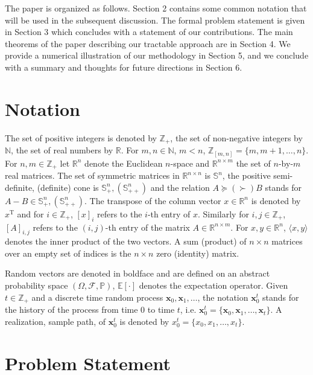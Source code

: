 \documentclass[letterpaper,11pt]{article}
\newcommand{\T}{\mathrm{T}}
\begin{document}
The paper is organized as follows.  Section 2 contains some common notation that will be used in the subsequent discussion. 
The formal problem statement is given in
Section 3 which concludes with a statement of our contributions. The main theorems of the paper describing our tractable approach are in Section 4. We provide a numerical 
illustration of our methodology in Section 5, and we conclude with a summary and thoughts for future directions in Section 6.


\section{Notation}
The set of positive integers is denoted by $ \mathbb{Z}_{+} $, the set of non-negative integers by
$\mathbb{N} $,
the set of real numbers by $ \mathbb{R}$. For $m,n \in \mathbb{N}$, $m< n $,
$ \mathbb{Z}_{[m,n]} = \{m,m+1, \hdots, n \}$.
For $n,m \in \mathbb{Z}_{+}$ let
$ \mathbb{R}^n$ denote the Euclidean $n$-space and  $ \mathbb{R}^{n \times m}$ 
the set of $n$-by-$m$ real matrices.  The set of symmetric matrices in 
$\mathbb{R}^{n \times n}$ is $\mathbb{S}^n$, the positive semi-definite, (definite) cone is $ \mathbb{S}^n_+, (\mathbb{S}_{++}^n)$ and the relation
$A \succeq ( \succ) B$ stands for $ A - B \in   \mathbb{S}^n_+, ( \mathbb{S}^n_{++})$.
The transpose of the column vector $ x \in \mathbb{R}^n$ is denoted by $ x^\T$ and for $i \in \mathbb{Z}_{+}$, $ [x]_i$ refers to the $i$-th entry of $ x$. Similarly for $ i, j \in \mathbb{Z}_{+}$,
$[ A]_{i,j}$ refers to the $(i,j)$-th entry of the matrix $ A \in \mathbb{R}^{n \times m}$. 
For $ x, y  \in \mathbb{R}^n$, $ \langle x, y \rangle$ denotes the inner product of the two vectors. 
A sum (product) of $n  \times n$ matrices over an empty set of indices is the 
$n \times n$ zero (identity) matrix.

Random vectors are denoted in boldface and are defined on an abstract probability space $( \Omega, \mathcal{F}, \mathbb{P})$,  $ \mathbb{E}[\cdot]$ denotes the expectation operator. 
Given $t  \in \mathbb{Z}_+$ and a  discrete time random process $\mathbf{x}_0, \mathbf{x}_1, \hdots$, 
the notation $\mathbf{x}_0^t$ stands for the history of the process from time $0$ to time $t$, i.e. $ \mathbf{x}_0^t = \{\mathbf{x}_0, \mathbf{x}_1, \hdots, \mathbf{x}_t \}$. A realization, sample path,  of $\mathbf{x}_0^t$ is denoted by $x_0^t = \{x_0, x_1, \hdots, x_t \}$.

\section{Problem Statement}
\end{document}

